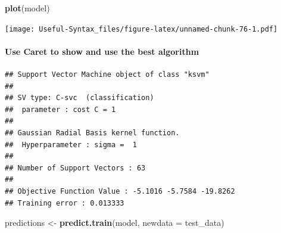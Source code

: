 \documentclass[
]{article}
\newenvironment{Shaded}{\begin{snugshade}}{\end{snugshade}}
\newcommand{\AttributeTok}[1]{\textcolor[rgb]{0.13,0.29,0.53}{#1}}
\newcommand{\FunctionTok}[1]{\textcolor[rgb]{0.13,0.29,0.53}{\textbf{#1}}}
\newcommand{\NormalTok}[1]{#1}
\newcommand{\OtherTok}[1]{\textcolor[rgb]{0.56,0.35,0.01}{#1}}
\newcommand{\SpecialCharTok}[1]{\textcolor[rgb]{0.81,0.36,0.00}{\textbf{#1}}}
\begin{document}
\begin{Shaded}
\begin{Highlighting}[]
\FunctionTok{plot}\NormalTok{(model)}
\end{Highlighting}
\end{Shaded}

\texttt{[image: Useful-Syntax\_files/figure-latex/unnamed-chunk-76-1.pdf]}

\hypertarget{use-caret-to-show-and-use-the-best-algorithm}{%
\paragraph{Use Caret to show and use the best algorithm}\label{use-caret-to-show-and-use-the-best-algorithm}}

\begin{Shaded}
\end{Shaded}

\begin{verbatim}
## Support Vector Machine object of class "ksvm" 
## 
## SV type: C-svc  (classification) 
##  parameter : cost C = 1 
## 
## Gaussian Radial Basis kernel function. 
##  Hyperparameter : sigma =  1 
## 
## Number of Support Vectors : 63 
## 
## Objective Function Value : -5.1016 -5.7584 -19.8262 
## Training error : 0.013333
\end{verbatim}

\begin{Shaded}
\begin{Highlighting}[]
\NormalTok{predictions }\OtherTok{\textless{}{-}} \FunctionTok{predict.train}\NormalTok{(model, }\AttributeTok{newdata =}\NormalTok{ test\_data)}
\end{Highlighting}
\end{Shaded}

\begin{Shaded}
\end{Shaded}
\end{document}
